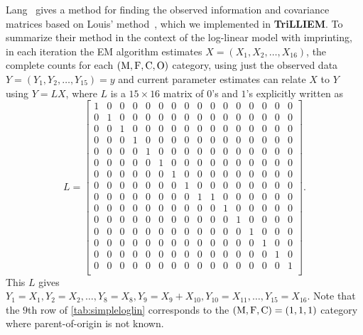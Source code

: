 Lang~\cite{Lang92} gives a method for finding the observed information and covariance matrices based on Louis' method~\cite{Loui82}, which we implemented in \textbf{TriLLIEM}.
To summarize their method in the context of the log-linear model with imprinting, in each iteration the EM algorithm estimates $X = (X_1, X_2, \ldots, X_{16})$, the complete counts for each $({\rm M}, {\rm F}, {\rm C}, {\rm O})$ category, using just the observed data $Y = (Y_1, Y_2, \ldots, Y_{15}) = y$ and current parameter estimates can relate $X$ to $Y$ using $Y = LX$, where $L$ is a $15 \times 16$ matrix of $0$'s and $1$'s explicitly written as
\setcounter{MaxMatrixCols}{16}
\begin{equation*}
  L =\begin{bmatrix}
1 & 0 & 0 & 0 & 0 & 0 & 0 & 0 & 0 & 0 & 0 & 0 & 0 & 0 & 0 & 0 \\
0 & 1 & 0 & 0 & 0 & 0 & 0 & 0 & 0 & 0 & 0 & 0 & 0 & 0 & 0 & 0 \\
0 & 0 & 1 & 0 & 0 & 0 & 0 & 0 & 0 & 0 & 0 & 0 & 0 & 0 & 0 & 0 \\
0 & 0 & 0 & 1 & 0 & 0 & 0 & 0 & 0 & 0 & 0 & 0 & 0 & 0 & 0 & 0 \\
0 & 0 & 0 & 0 & 1 & 0 & 0 & 0 & 0 & 0 & 0 & 0 & 0 & 0 & 0 & 0 \\
0 & 0 & 0 & 0 & 0 & 1 & 0 & 0 & 0 & 0 & 0 & 0 & 0 & 0 & 0 & 0 \\
0 & 0 & 0 & 0 & 0 & 0 & 1 & 0 & 0 & 0 & 0 & 0 & 0 & 0 & 0 & 0 \\
0 & 0 & 0 & 0 & 0 & 0 & 0 & 1 & 0 & 0 & 0 & 0 & 0 & 0 & 0 & 0 \\
0 & 0 & 0 & 0 & 0 & 0 & 0 & 0 & 1 & 1 & 0 & 0 & 0 & 0 & 0 & 0 \\
0 & 0 & 0 & 0 & 0 & 0 & 0 & 0 & 0 & 0 & 1 & 0 & 0 & 0 & 0 & 0 \\
0 & 0 & 0 & 0 & 0 & 0 & 0 & 0 & 0 & 0 & 0 & 1 & 0 & 0 & 0 & 0 \\
0 & 0 & 0 & 0 & 0 & 0 & 0 & 0 & 0 & 0 & 0 & 0 & 1 & 0 & 0 & 0 \\
0 & 0 & 0 & 0 & 0 & 0 & 0 & 0 & 0 & 0 & 0 & 0 & 0 & 1 & 0 & 0 \\
0 & 0 & 0 & 0 & 0 & 0 & 0 & 0 & 0 & 0 & 0 & 0 & 0 & 0 & 1 & 0 \\
0 & 0 & 0 & 0 & 0 & 0 & 0 & 0 & 0 & 0 & 0 & 0 & 0 & 0 & 0 & 1 \\
\end{bmatrix}.
\end{equation*}
This $L$ gives $Y_1 = X_1, Y_2 = X_2, \ldots, Y_8 = X_8, Y_9 = X_9 + X_{10}, Y_{10} = X_{11}, \ldots, Y_{15} = X_{16}$.
Note that the $9$th row of \cref{tab:simpleloglin} corresponds to the $({\rm M},{\rm F},{\rm C})=(1,1,1)$ category where parent-of-origin is not known.
